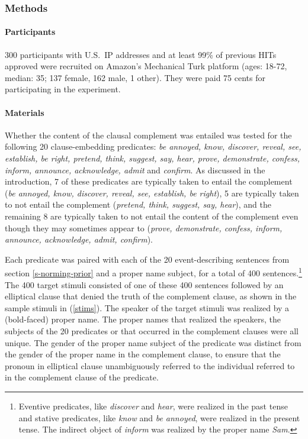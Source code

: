 \documentclass[11pt,fleqn]{article}
\newcommand{\6}{\mbox{$[\hspace*{-.6mm}[$}}
\newcommand{\9}{\mbox{$]\hspace*{-.6mm}]$}}
\begin{document}
\subsubsection{Methods}\label{s-methods-2}

\paragraph{Participants} 300 participants with U.S.\ IP addresses and at least 99\% of previous HITs approved were recruited on Amazon's Mechanical Turk platform (ages: 18-72, median: 35; 137 female, 162 male, 1 other). They were paid 75 cents for participating in the experiment.

\paragraph{Materials} Whether the content of the clausal complement was entailed was tested for the following 20 clause-embedding predicates: {\em be annoyed, know, discover, reveal, see, establish, be right, pretend, think, suggest, say, hear, prove, demonstrate, confess, inform, announce, acknowledge, admit} and {\em confirm}. As discussed in the introduction, 7 of these predicates are typically taken to entail the complement ({\em be annoyed, know, discover, reveal, see, establish, be right}), 5 are typically taken to not entail the complement ({\em pretend, think, suggest, say, hear}), and the remaining 8 are typically taken to not entail the content of the complement even though they may sometimes appear to ({\em prove, demonstrate, confess, inform, announce, acknowledge, admit, confirm}).

Each predicate was paired with each of the 20 event-describing sentences from section \ref{s-norming-prior} and a proper name subject, for a total of 400 sentences.\footnote{Eventive predicates, like {\em discover} and {\em hear}, were realized in the past tense and stative predicates, like {\em know} and {\em be annoyed}, were realized in the present tense. The indirect object of {\em inform} was realized by the proper name {\em Sam}.} The 400 target stimuli consisted of one of these 400 sentences followed by an elliptical clause that denied the truth of the complement clause, as shown in the sample stimuli in (\ref{stims}). The speaker of the target stimuli was realized by a (bold-faced) proper name. The proper names that realized the speakers, the subjects of the 20 predicates or that occurred in the complement clauses were all unique. The gender of the proper name subject of the predicate was distinct from the gender of the proper name in the complement clause, to ensure that the pronoun in elliptical clause unambiguously referred to the individual referred to in the complement clause of the predicate.
\end{document}
